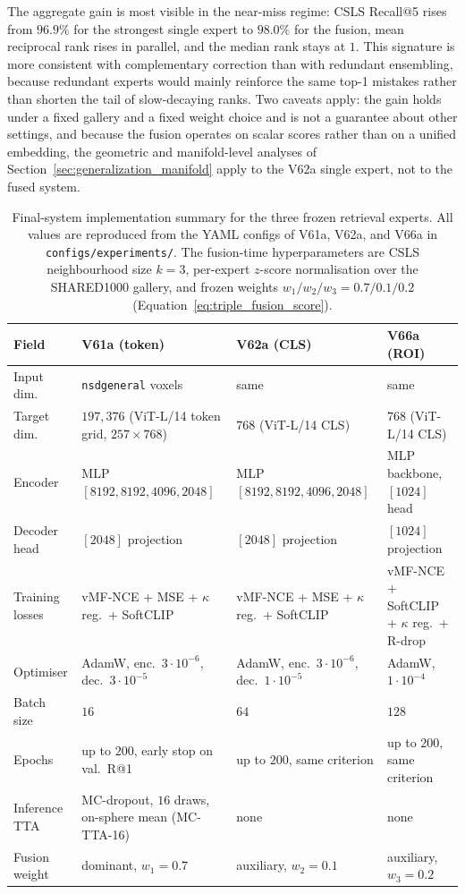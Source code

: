 The aggregate gain is most visible in the near-miss regime: CSLS Recall@5 rises from $96.9\%$ for the strongest single expert to $98.0\%$ for the fusion, mean reciprocal rank rises in parallel, and the median rank stays at $1$. This signature is more consistent with complementary correction than with redundant ensembling, because redundant experts would mainly reinforce the same top-1 mistakes rather than shorten the tail of slow-decaying ranks. Two caveats apply: the gain holds under a fixed gallery and a fixed weight choice and is not a guarantee about other settings, and because the fusion operates on scalar scores rather than on a unified embedding, the geometric and manifold-level analyses of Section~\ref{sec:generalization_manifold} apply to the V62a single expert, not to the fused system.

\begin{table}[htbp]
\centering
\footnotesize
\begin{tabularx}{\textwidth}{@{}>{\raggedright\arraybackslash}p{2.3cm} >{\raggedright\arraybackslash}X >{\raggedright\arraybackslash}X >{\raggedright\arraybackslash}X@{}}
\toprule
\textbf{Field} & \textbf{V61a (token)} & \textbf{V62a (CLS)} & \textbf{V66a (ROI)} \\
\midrule
Input dim. & \texttt{nsdgeneral} voxels & same & same \\
Target dim. & $197{,}376$ (ViT-L/14 token grid, $257{\times}768$) & $768$ (ViT-L/14 CLS) & $768$ (ViT-L/14 CLS) \\
Encoder & MLP $[8192,8192,4096,2048]$ & MLP $[8192,8192,4096,2048]$ & MLP backbone, $[1024]$ head \\
Decoder head & $[2048]$ projection & $[2048]$ projection & $[1024]$ projection \\
Training losses & vMF-NCE + MSE + $\kappa$ reg.\ + SoftCLIP & vMF-NCE + MSE + $\kappa$ reg.\ + SoftCLIP & vMF-NCE + SoftCLIP + $\kappa$ reg.\ + R-drop \\
Optimiser & AdamW, enc.\ $3\!\cdot\!10^{-6}$, dec.\ $3\!\cdot\!10^{-5}$ & AdamW, enc.\ $3\!\cdot\!10^{-6}$, dec.\ $1\!\cdot\!10^{-5}$ & AdamW, $1\!\cdot\!10^{-4}$ \\
Batch size & $16$ & $64$ & $128$ \\
Epochs & up to $200$, early stop on val.\ R@1 & up to $200$, same criterion & up to $200$, same criterion \\
Inference TTA & MC-dropout, $16$ draws, on-sphere mean (MC-TTA-16) & none & none \\
Fusion weight & dominant, $w_1{=}0.7$ & auxiliary, $w_2{=}0.1$ & auxiliary, $w_3{=}0.2$ \\
\bottomrule
\end{tabularx}
\caption{Final-system implementation summary for the three frozen retrieval experts. All values are reproduced from the YAML configs of V61a, V62a, and V66a in \texttt{configs/experiments/}. The fusion-time hyperparameters are CSLS neighbourhood size $k=3$, per-expert $z$-score normalisation over the SHARED1000 gallery, and frozen weights $w_1/w_2/w_3 = 0.7/0.1/0.2$ (Equation~\eqref{eq:triple_fusion_score}).}
\label{tab:hyperparameters}
\end{table}

